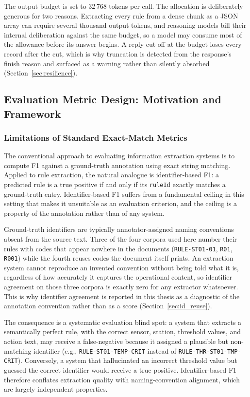 \documentclass[11pt]{article}
\begin{document}
The output budget is set to 32\,768 tokens per call. The allocation is deliberately
generous for two reasons. Extracting every rule from a dense chunk as a JSON array
can require several thousand output tokens, and reasoning models bill their
internal deliberation against the same budget, so a model may consume most of the
allowance before its answer begins. A reply cut off at the budget loses every
record after the cut, which is why truncation is detected from the response's
finish reason and surfaced as a warning rather than silently absorbed
(Section~\ref{sec:resilience}).

\subsection{Evaluation Metric Design: Motivation and Framework}
\label{sec:metric_design_overview}

\subsubsection{Limitations of Standard Exact-Match Metrics}
\label{sec:eval_limitations}

The conventional approach to evaluating information extraction systems is to
compute F1 against a ground-truth annotation using exact string matching.
Applied to rule extraction, the natural analogue is identifier-based F1:
a predicted rule is a true positive if and only if its \texttt{ruleId} exactly
matches a ground-truth entry.
Identifier-based F1 suffers from a fundamental ceiling in this setting that makes
it unsuitable as an evaluation criterion, and the ceiling is a property of the
annotation rather than of any system.

Ground-truth identifiers are typically annotator-assigned naming conventions
absent from the source text. Three of the four corpora used here number their
rules with codes that appear nowhere in the documents (\texttt{RULE-ST01-01},
\texttt{R01}, \texttt{R001}) while the fourth reuses codes the document itself
prints. An extraction system cannot reproduce an invented convention without
being told what it is, regardless of how accurately it captures the operational
content, so identifier agreement on those three corpora is exactly zero for any
extractor whatsoever. This is why identifier agreement is reported in this thesis
as a diagnostic of the annotation convention rather than as a score
(Section~\ref{sec:id_reuse}).

The consequence is a systematic evaluation blind spot: a system that extracts
a semantically perfect rule, with the correct sensor, station, threshold values,
and action text, may receive a false-negative because it assigned a plausible
but non-matching identifier (e.g., \texttt{RULE-ST01-TEMP-CRIT} instead of
\texttt{RULE-THR-ST01-TMP-CRIT}).
Conversely, a system that hallucinated an incorrect threshold value but guessed
the correct identifier would receive a true positive.
Identifier-based F1 therefore conflates extraction quality with
naming-convention alignment, which are largely independent properties.
\end{document}
